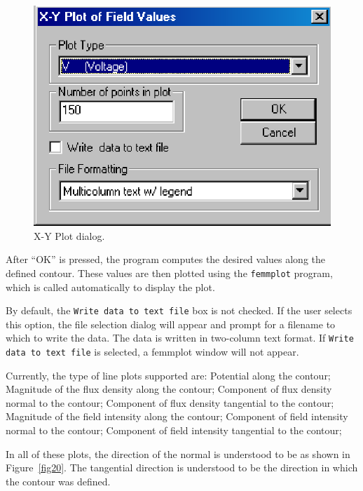 \documentclass[12pt]{report}
\begin{document}
\begin{figure}[htbp]
\centerline{\includegraphics{belaman19.eps}}
\caption{X-Y Plot dialog.}
\label{fig19}
\end{figure}




After ``OK'' is pressed, the program computes the desired values
along the defined contour. These values are then plotted using the
\texttt{femmplot} program, which is called automatically to display
the plot.





By default, the \texttt{Write data to text file} box is not
checked. If the user selects this option, the file selection dialog
will appear and prompt for a filename to which to write the data.
The data is written in two-column text format. If \texttt{Write
data to text file} is selected, a femmplot window will not appear.





Currently, the type of line plots supported are: Potential along the
contour; Magnitude of the flux density along the contour; Component of flux
density normal to the contour; Component of flux density tangential to the
contour; Magnitude of the field intensity along the contour; Component of
field intensity normal to the contour; Component of field intensity
tangential to the contour;





In all of these plots, the direction of the normal is understood to
be as shown in Figure~\ref{fig20}. The tangential direction is
understood to be the direction in which the contour was defined.
\end{document}
